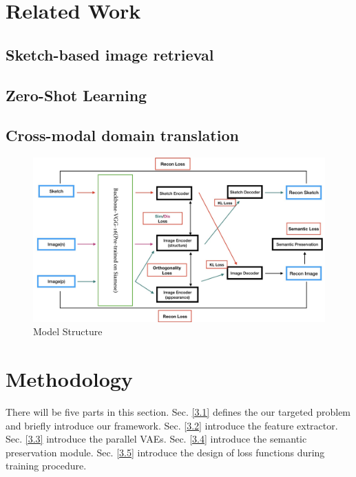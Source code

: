 \documentclass[10pt,twocolumn,letterpaper]{article}
\begin{document}

\section{Related Work}

\subsection{Sketch-based image retrieval}

\subsection{Zero-Shot Learning}

\subsection{Cross-modal domain translation}


\begin{figure}
\begin{center}
\includegraphics[width=0.8\linewidth]{model_structure.jpg}
\end{center}
   \caption{Model Structure}
\label{fig:short}
\end{figure}

\section{Methodology}
There will be five parts in this section. 
Sec. \ref{3.1} defines the our targeted problem and briefly introduce our framework. 
Sec. \ref{3.2} introduce the feature extractor. 
Sec. \ref{3.3} introduce the parallel VAEs. 
Sec. \ref{3.4} introduce the semantic preservation module. 
Sec. \ref{3.5} introduce the design of loss functions during training procedure.
\end{document}
